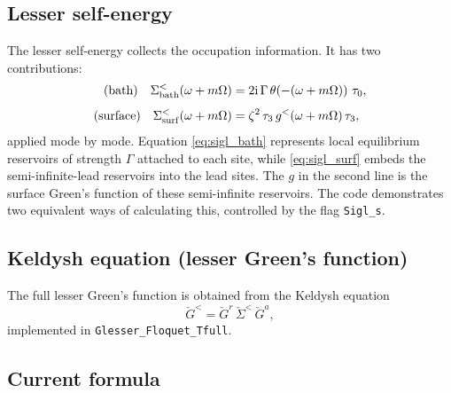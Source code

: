 \documentclass[11pt,a4paper]{article}
\newcommand{\ii}{\mathrm{i}}
\newcommand{\Gr}{\check{G}}            %
\newcommand{\Sig}{\check{\Sigma}}      %
\begin{document}
\subsection{Lesser self-energy}
\label{sec:lesser_se}

The lesser self-energy collects the occupation information. It has two contributions:
\begin{align}
  \text{(bath)}\quad
  \Sigma^<_{\rm bath}(\omega+m\Omega)
    &= 2\ii\,\Gamma\,\theta\!\left(-(\omega+m\Omega)\right)\,\tau_0,
  \label{eq:sigl_bath}\\[4pt]
  \text{(surface)}\quad
  \Sigma^<_{\rm surf}(\omega+m\Omega)
    &= \zeta^2\,\tau_3\, g^<(\omega+m\Omega)\,\tau_3,
  \label{eq:sigl_surf}
\end{align}
applied mode by mode. Equation \eqref{eq:sigl_bath} represents local equilibrium 
reservoirs of strength $\Gamma$ attached to each site, while \eqref{eq:sigl_surf} 
embeds the semi-infinite-lead reservoirs into the lead sites. The $g$ in the second 
line is the surface Green's function of these semi-infinite reservoirs. The code 
demonstrates two equivalent ways of calculating this, controlled by the flag \texttt{Sigl\_s}. 

\subsection{Keldysh equation (lesser Green's function)}

The full lesser Green's function is obtained from the Keldysh equation
\begin{equation}
  \Gr^< = \Gr^r\,\Sig^<\,\Gr^a,
  \label{eq:keldysh}
\end{equation}
implemented in \texttt{Glesser\_Floquet\_Tfull}.

\subsection{Current formula}
\label{sec:current}
\end{document}
